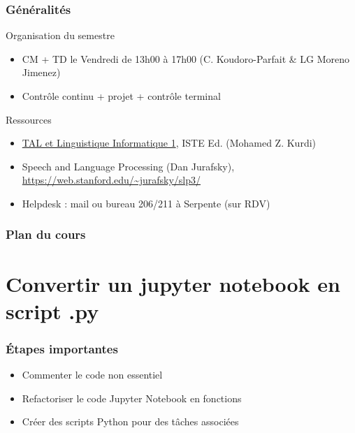 \begin{frame}
  \frametitle{Généralités}
  \begin{block}{Organisation du semestre}
 \begin{itemize}
   \item CM + TD le Vendredi de 13h00 à 17h00 (C. Koudoro-Parfait \& LG Moreno Jimenez)
   \item Contrôle continu + projet + contrôle terminal
  
  \end{itemize}
  \end{block}
\begin{block}{Ressources}
  \begin{itemize}
  \item \href{http://paris-sorbonne.hosted.exlibrisgroup.com/F?func=find-c&ccl_term=idn=ppn199563403&local_base=MAH01}{TAL et Linguistique Informatique 1}, ISTE Ed. (Mohamed Z. Kurdi) 
  \item Speech and Language Processing (Dan Jurafsky), \url{https://web.stanford.edu/~jurafsky/slp3/} 
  \item Helpdesk : mail ou bureau 206/211 à Serpente (sur RDV)
  \end{itemize}
   \end{block}
\end{frame}

\begin{frame}
  \frametitle{Plan du cours}
\tableofcontents

\end{frame}
\section{Convertir un jupyter notebook en script .py}


\begin{frame}
 \frametitle{Étapes importantes}
\begin{itemize}

\item Commenter le code non essentiel 

\item Refactoriser le code Jupyter Notebook en fonctions

\item Créer des scripts Python pour des tâches associées

\end{itemize} 
\end{frame}

